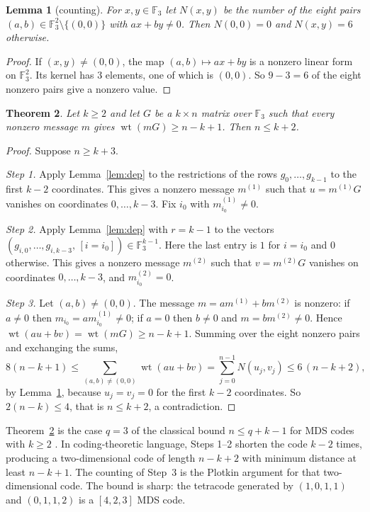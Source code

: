\documentclass[11pt]{article}
\newtheorem{theorem}{Theorem}
\newtheorem{lemma}[theorem]{Lemma}
\theoremstyle{remark}
\newcommand{\F}{\mathbb{F}_3}
\newcommand{\wt}{\operatorname{wt}}
\begin{document}
\begin{lemma}[counting]\label{lem:count}
For $x,y\in\F$ let $N(x,y)$ be the number of the eight pairs
$(a,b)\in\F^2\setminus\{(0,0)\}$ with $ax+by\ne0$. Then $N(0,0)=0$ and
$N(x,y)=6$ otherwise.
\end{lemma}
\begin{proof}
If $(x,y)\ne(0,0)$, the map $(a,b)\mapsto ax+by$ is a nonzero linear form on
$\F^2$. Its kernel has $3$ elements, one of which is $(0,0)$. So $9-3=6$ of the
eight nonzero pairs give a nonzero value.
\end{proof}

\begin{theorem}\label{thm:main}
Let $k\ge2$ and let $G$ be a $k\times n$ matrix over $\F$ such that every
nonzero message $m$ gives $\wt(mG)\ge n-k+1$. Then $n\le k+2$.
\end{theorem}
\begin{proof}
Suppose $n\ge k+3$.

\emph{Step 1.} Apply Lemma~\ref{lem:dep} to the restrictions of the rows
$g_0,\dots,g_{k-1}$ to the first $k-2$ coordinates. This gives a nonzero
message $m^{(1)}$ such that $u=m^{(1)}G$ vanishes on coordinates
$0,\dots,k-3$. Fix $i_0$ with $m^{(1)}_{i_0}\ne0$.

\emph{Step 2.} Apply Lemma~\ref{lem:dep} with $r=k-1$ to the vectors
$(g_{i,0},\dots,g_{i,k-3},\,[i=i_0])\in\F^{k-1}$. Here the last entry is $1$ for
$i=i_0$ and $0$ otherwise. This gives a nonzero message $m^{(2)}$ such that
$v=m^{(2)}G$ vanishes on coordinates $0,\dots,k-3$, and $m^{(2)}_{i_0}=0$.

\emph{Step 3.} Let $(a,b)\ne(0,0)$. The message $m=am^{(1)}+bm^{(2)}$ is
nonzero: if $a\ne0$ then $m_{i_0}=am^{(1)}_{i_0}\ne0$; if $a=0$ then $b\ne0$
and $m=bm^{(2)}\ne0$. Hence $\wt(au+bv)=\wt(mG)\ge n-k+1$. Summing over the
eight nonzero pairs and exchanging the sums,
\[
8(n-k+1)\le\sum_{(a,b)\ne(0,0)}\wt(au+bv)=\sum_{j=0}^{n-1}N(u_j,v_j)
\le 6\,(n-k+2),
\]
by Lemma~\ref{lem:count}, because $u_j=v_j=0$ for the first $k-2$ coordinates.
So $2(n-k)\le4$, that is $n\le k+2$, a contradiction.
\end{proof}

Theorem~\ref{thm:main} is the case $q=3$ of the classical bound $n\le q+k-1$
for MDS codes with $k\ge2$ \cite{ms}. In coding-theoretic language, Steps 1--2
shorten the code $k-2$ times, producing a two-dimensional code of length
$n-k+2$ with minimum distance at least $n-k+1$. The counting of Step~3 is
the Plotkin argument for that two-dimensional code. The bound is sharp: the
tetracode generated by $(1,0,1,1)$ and $(0,1,1,2)$ is a $[4,2,3]$ MDS code.
\end{document}
